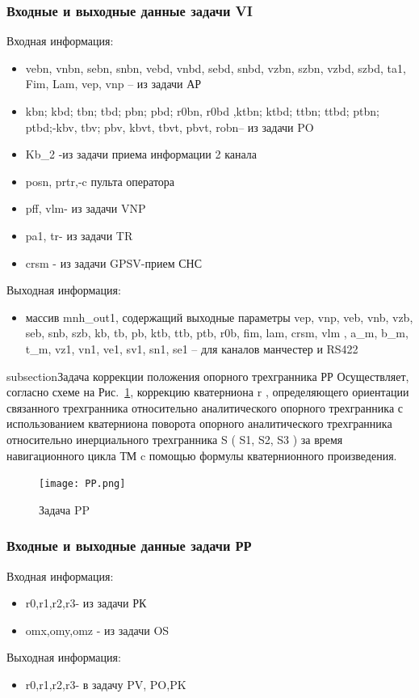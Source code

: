 \subsubsection{Входные и выходные данные задачи VI}
Входная информация:    
\begin{itemize}
\item vebn, vnbn, sebn, snbn, vebd, vnbd, sebd, snbd, vzbn, szbn, vzbd, szbd, ta1, Fim, Lam, vep, vnp – из задачи АР
\item kbn; kbd;   tbn;  tbd;   pbn;  pbd; r0bn,   r0bd ,ktbn; ktbd; ttbn; ttbd; ptbn; ptbd;-kbv, tbv; pbv, kbvt, tbvt, pbvt, robn– из задачи PO
\item Kb_2 -из задачи приема информации 2 канала
\item posn, prtr,-c  пульта оператора
\item pff, vlm- из задачи VNP
\item pa1, tr- из задачи TR
\item crsm - из задачи GPSV-прием СНС
\end{itemize}
Выходная информация:
\begin{itemize}
    \item массив mnh_out1,   содержащий выходные параметры vep, vnp, veb, vnb, vzb, seb, snb, szb, kb, tb, pb, ktb, ttb, ptb, r0b, fim, lam, crsm, vlm , 
    a_m, b_m,  t_m, vz1,  vn1,   ve1,  sv1,  sn1,   se1   – для  каналов  манчестер и RS422
\end{itemize}
subsection{Задача коррекции положения опорного трехгранника РР}
Осуществляет, согласно схеме на Рис.~\ref{fig:PP}, коррекцию  кватерниона r ,  определяющего ориентации связанного трехгранника относительно  
аналитического опорного трехгранника с использованием  кватерниона  поворота опорного аналитического трехгранника   относительно   
инерциального трехгранника  S  (  S1,  S2,  S3 ) за время навигационного  цикла  ТМ c  помощью  формулы кватернионного произведения.
\begin{figure}[H]
    \centering
    \texttt{[image: PP.png]}
    \caption{Задача PP}
    \label{fig:PP}
\end{figure}
\subsubsection{Входные и выходные данные задачи РР}
Входная информация:
\begin{itemize}
 \item r0,r1,r2,r3- из задачи  РК
 \item omx,omy,omz - из задачи  OS
\end{itemize}
Выходная информация:
\begin{itemize}
\item r0,r1,r2,r3- в задачу PV, PO,PK
\end{itemize}